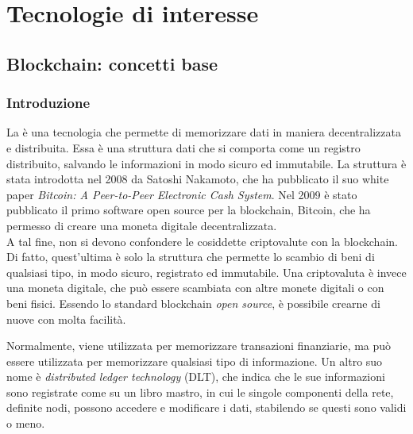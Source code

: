 \chapter{Tecnologie di interesse}\label{cap:tecnologie}


\section{Blockchain: concetti base}\label{sec:tecnologie-blockchain}

\subsection{Introduzione}\label{sec:tecnologie-blockchain-introduzione}

La  è una tecnologia che permette di memorizzare dati in maniera decentralizzata e distribuita.
Essa è una struttura dati che si comporta come un registro distribuito, salvando le informazioni in modo sicuro ed immutabile.
La struttura è stata introdotta nel 2008 da Satoshi Nakamoto, che ha pubblicato il suo white paper \textit{Bitcoin: A Peer-to-Peer Electronic Cash System}.
Nel 2009 è stato pubblicato il primo software open source per la blockchain, Bitcoin, che ha permesso di creare una moneta digitale decentralizzata. \\

A tal fine, non si devono confondere le cosiddette criptovalute con la blockchain. Di fatto, quest'ultima è solo la struttura che permette lo scambio di beni di qualsiasi tipo,
in modo sicuro, registrato ed immutabile. Una criptovaluta è invece una moneta digitale, che può essere scambiata con altre monete digitali o con beni fisici.
Essendo lo standard blockchain \textit{open source}, è possibile crearne di nuove con molta facilità.

Normalmente, viene utilizzata per memorizzare transazioni finanziarie, ma può essere utilizzata per memorizzare qualsiasi tipo di informazione.
Un altro suo nome è \textit{distributed ledger technology} (DLT), che indica che le sue informazioni sono registrate come su un libro mastro, in cui le singole componenti della rete,
definite nodi, possono accedere e modificare i dati, stabilendo se questi sono validi o meno. 

